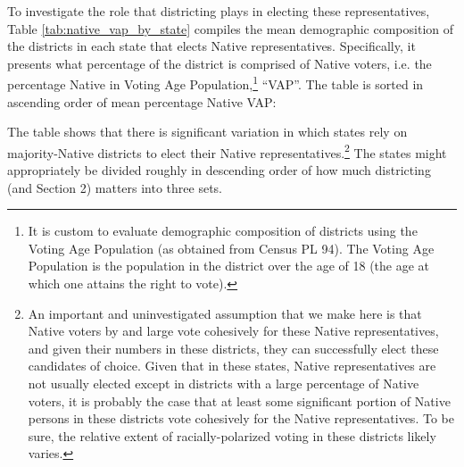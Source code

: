 \documentclass[12pt]{article}
\begin{document}
To investigate the role that districting plays in electing these representatives, Table \ref{tab:native_vap_by_state} compiles the mean demographic composition of the districts in each state that elects Native representatives. Specifically, it presents what percentage of the district is comprised of Native voters, i.e. the percentage Native in Voting Age Population,\footnote{It is custom to evaluate demographic composition of districts using the Voting Age Population (as obtained from Census PL 94). The Voting Age Population is the population in the district over the age of 18 (the age at which one attains the right to vote).} ``VAP''. The table is sorted in ascending order of mean percentage Native VAP:

\begin{table}[ht]
\centering
\caption{Native VAP in Districts Electing Native Representatives by State}
\label{tab:native_vap_by_state}

\end{table}


The table shows that there is significant variation in which states rely on majority-Native districts to elect their Native representatives.\footnote{An important and uninvestigated assumption that we make here is that Native voters by and large vote cohesively for these Native representatives, and given their numbers in these districts, they can successfully elect these candidates of choice. Given that in these states, Native representatives are not usually elected except in districts with a large percentage of Native voters, it is probably the case that at least some significant portion of Native persons in these districts vote cohesively for the Native representatives. To be sure, the relative extent of racially-polarized voting in these districts likely varies.} The states might appropriately be divided roughly in descending order of how much districting (and Section 2) matters into three sets.
\end{document}
